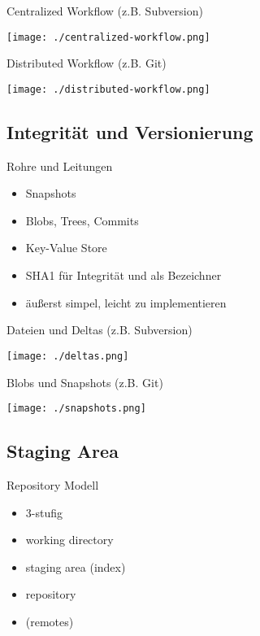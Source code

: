 \begin{frame}{Centralized Workflow (z.B. Subversion)}
    \centerline{\texttt{[image: ./centralized-workflow.png]}}
\end{frame}

\begin{frame}{Distributed Workflow (z.B. Git)}
    \centerline{\texttt{[image: ./distributed-workflow.png]}}
\end{frame}

\subsection{Integrität und Versionierung}

\begin{frame}{Rohre und Leitungen}
    \begin{itemize}[<+->]
        \item Snapshots
        \item Blobs, Trees, Commits
        \item Key-Value Store
        \item SHA1 für Integrität und als Bezeichner
        \item äußerst simpel, leicht zu implementieren
    \end{itemize}
\end{frame}

\begin{frame}{Dateien und Deltas (z.B. Subversion)}
    \centerline{\texttt{[image: ./deltas.png]}}
\end{frame}

\begin{frame}{Blobs und Snapshots (z.B. Git)}
    \centerline{\texttt{[image: ./snapshots.png]}}
\end{frame}

\subsection{Staging Area}

\begin{frame}{Repository Modell}
    \begin{itemize}[<+->]
        \item 3-stufig
        \item working directory
        \item staging area (index)
        \item repository
        \item (remotes)
    \end{itemize}
\end{frame}

